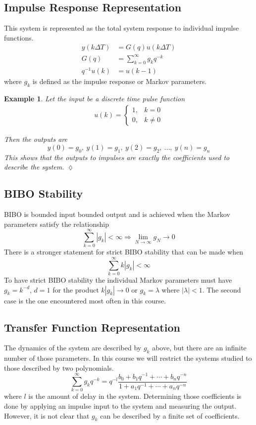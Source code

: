 \documentclass[lecture,12pt,]{pcms-l}
\theoremstyle{example}
\newtheorem{example}{Example}[section]
\newcommand{\dt}{\Delta T}
\begin{document}
\subsection{Impulse Response Representation}
This system is represented as the total system response to individual impulse functions.
\begin{align*}
y(k\dt) &= G(q)u(k\dt) \\
G(q) &= \sum_{k=0}^\infty g_kq^{-k} \\
q^{-1}u(k) &= u(k-1)
\end{align*}
where $g_k$ is defined as the impulse response or Markov parameters.

\begin{example}
Let the input be a discrete time pulse function
\begin{align}
\label{eq:03impulse}
u(k) = \begin{cases} 1, & k=0 \\ 0, & k\neq 0 \end{cases}
\end{align}

Then the outputs are
$$y(0)=g_0, ~y(1)=g_1, ~y(2)=g_2, ~\ldots, ~y(n)=g_n$$
This shows that the outputs to impulses are exactly the coefficients used to describe the system.
$\lozenge$
\end{example}

\subsection{BIBO Stability}
BIBO is bounded input bounded output and is achieved when the Markov parameters satisfy the relationship
$$\sum_{k=0}^\infty |g_k| < \infty \Rightarrow \lim_{N\to \infty} g_N \to 0$$
There is a stronger statement for strict BIBO stability that can be made when
$$\sum_{k=0}^\infty k|g_k| < \infty$$
To have strict BIBO stability the individual Markov parameters must have $g_k=k^{-d}$, $d=1$ for the product $k|g_k|\to 0$ or $g_k=\lambda$ where $|\lambda|<1$. The second case is the one encountered most often in this course.

\subsection{Transfer Function Representation}
The dynamics of the system are described by $g_k$ above, but there are an infinite number of those parameters. In this course we will restrict the systems studied to those described by two polynomials.
$$\sum_{k=0}^\infty g_kq^{-k} = q^{-l} \frac{b_0 + b_1q^{-1} + \cdots + b_nq^{-n}}{1+a_1q^{-1} + \cdots + a_nq^{-n}}$$
where $l$ is the amount of delay in the system. Determining those coefficients is done by applying an impulse input to the system and measuring the output. However, it is not clear that $g_k$ can be described by a finite set of coefficients.
\end{document}
